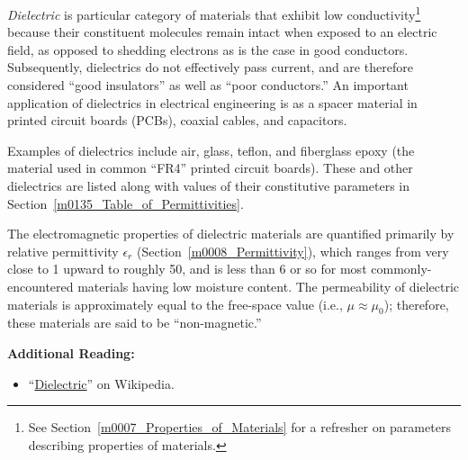 

\label{m0107_Dielectric_Media} %

\emph{Dielectric} is particular category of materials that exhibit low conductivity\footnote{See Section~\ref{m0007_Properties_of_Materials} for a refresher on parameters describing properties of materials.} because their constituent molecules remain intact when exposed to an electric field, as opposed to shedding electrons as is the case in good conductors.
Subsequently, dielectrics do not effectively pass current, and are therefore considered ``good insulators'' 
as well as ``poor conductors.'' 
An important application of dielectrics in electrical engineering is as a spacer material in printed circuit boards (PCBs), coaxial cables, and capacitors.

Examples of dielectrics include air, 
glass, 
teflon, 
 and fiberglass epoxy (the material used in common ``FR4'' 
printed circuit boards). 
These and other dielectrics are listed along with values of their constitutive parameters in Section~\ref{m0135_Table_of_Permittivities}.

The electromagnetic properties of dielectric materials are quantified primarily by relative permittivity 
$\epsilon_r$ (Section~\ref{m0008_Permittivity}), which ranges from very close to 1 upward to roughly 50, and is less than 6 or so for most commonly-encountered materials having low moisture content.  
The permeability 
of dielectric materials is approximately equal to the free-space value (i.e., $\mu\approx\mu_0$); therefore, these materials are said to be ``non-magnetic.''

{\bf Additional Reading:}
\begin{itemize}
\item ``\href{https://en.wikipedia.org/wiki/Dielectric}{Dielectric}'' on Wikipedia.
\end{itemize}

